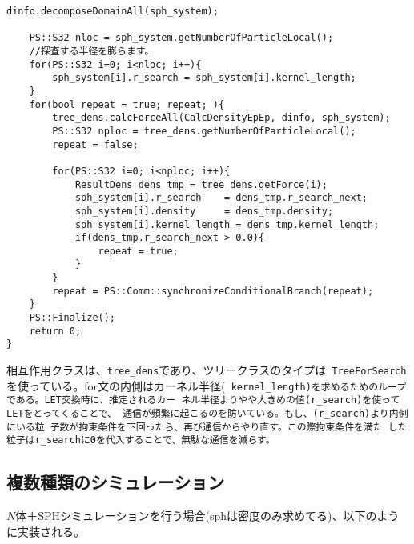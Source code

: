 \begin{lstlisting}[caption=stdSPHシミュレーションのサンプルコード]
    dinfo.decomposeDomainAll(sph_system);

    PS::S32 nloc = sph_system.getNumberOfParticleLocal();
    //探査する半径を膨らます。
    for(PS::S32 i=0; i<nloc; i++){
        sph_system[i].r_search = sph_system[i].kernel_length;
    }
    for(bool repeat = true; repeat; ){
        tree_dens.calcForceAll(CalcDensityEpEp, dinfo, sph_system);
        PS::S32 nploc = tree_dens.getNumberOfParticleLocal();
        repeat = false;

        for(PS::S32 i=0; i<nploc; i++){
            ResultDens dens_tmp = tree_dens.getForce(i);
            sph_system[i].r_search    = dens_tmp.r_search_next;
            sph_system[i].density     = dens_tmp.density;
            sph_system[i].kernel_length = dens_tmp.kernel_length;
            if(dens_tmp.r_search_next > 0.0){
                repeat = true;
            }
        }
        repeat = PS::Comm::synchronizeConditionalBranch(repeat);
    }
    PS::Finalize();
    return 0;
}
\end{lstlisting}

相互作用クラスは、{\tt tree\_dens}であり、ツリークラスのタイプは{\tt
TreeForSearch}を使っている。for文の内側はカーネル半径(\tt
kernel\_length)を求めるためのループである。LET交換時に、推定されるカー
ネル半径よりやや大きめの値(\tt r\_search)を使ってLETをとってくることで、
通信が頻繁に起こるのを防いている。もし、(\tt r\_search)より内側にいる粒
子数が拘束条件を下回ったら、再び通信からやり直す。この際拘束条件を満た
した粒子は{\tt r\_search}に0を代入することで、無駄な通信を減らす。

\subsection{複数種類のシミュレーション}

$N$体＋SPHシミュレーションを行う場合(sphは密度のみ求めてる)、以下のよう
に実装される。


